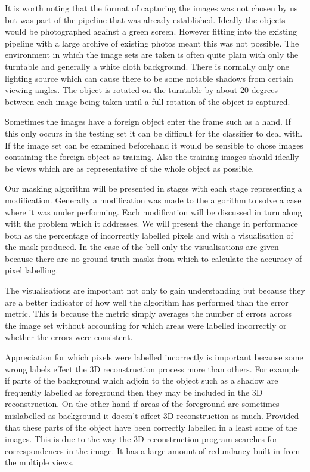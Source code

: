 \documentclass[12pt]{IIBproject}
\begin{document}
It is worth noting that the format of capturing the images was not chosen by us but was part of the pipeline that was already established. Ideally the objects would be photographed against a green screen. However fitting into the existing pipeline with a large archive of existing photos meant this was not possible. 
The environment in which the image sets are taken is often quite plain with only the turntable and generally a white cloth background. There is normally only one lighting source which can cause there to be some notable shadows from certain viewing angles. The object is rotated on the turntable by about 20 degrees between each image being taken until a full rotation of the object is captured. 

Sometimes the images have a foreign object enter the frame such as a hand. If this only occurs in the testing set it can be difficult for the classifier to deal with. If the image set can be examined beforehand it would be sensible to chose images containing the foreign object as training. Also the training images should ideally be views which are as representative of the whole object as possible.

Our masking algorithm will be presented in stages with each stage representing a modification. Generally a modification was made to the algorithm to solve a case where it was under performing. Each modification will be discussed in turn along with the problem which it addresses. We will present the change in performance both as the percentage of incorrectly labelled pixels and with a visualisation of the mask produced. In the case of the bell only the visualisations are given because there are no ground truth masks from which to calculate the accuracy of pixel labelling.

The visualisations are important not only to gain understanding but because they are a better indicator of how well the algorithm has performed than the error metric. This is because the metric simply averages the number of errors across the image set without accounting for which areas were labelled incorrectly or whether the errors were consistent. 

Appreciation for which pixels were labelled incorrectly is important because some wrong labels effect the 3D reconstruction process more than others. For example if parts of the background which adjoin to the object such as a shadow are frequently labelled as foreground then they may be included in the 3D reconstruction. On the other hand if areas of the foreground are sometimes mislabelled as background it doesn't affect 3D reconstruction as much. Provided that these parts of the object have been correctly labelled in a least some of the images. This is due to the way the 3D reconstruction program searches for correspondences in the image. It has a large amount of redundancy built in from the multiple views.
\end{document}
